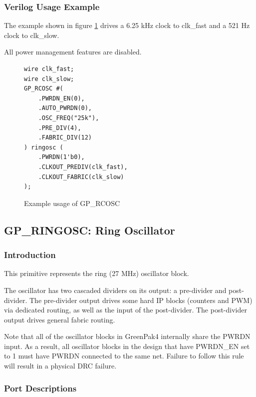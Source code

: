 \documentclass{article}
\begin{document}
\pagebreak
\subsubsection{Verilog Usage Example}

The example shown in figure \ref{gp-rcosc-example} drives a 6.25 kHz clock to clk\_fast and a 521 Hz clock to
clk\_slow.

All power management features are disabled.

\begin{figure}[h]
\begin{lstlisting}
wire clk_fast;
wire clk_slow;
GP_RCOSC #(
	.PWRDN_EN(0),
	.AUTO_PWRDN(0),
	.OSC_FREQ("25k"),
	.PRE_DIV(4),
	.FABRIC_DIV(12)
) ringosc (
	.PWRDN(1'b0),
	.CLKOUT_PREDIV(clk_fast),
	.CLKOUT_FABRIC(clk_slow)
);
\end{lstlisting}
\caption{Example usage of GP\_RCOSC}
\label{gp-rcosc-example}
\end{figure}


\pagebreak
\subsection{GP\_RINGOSC: Ring Oscillator}

\subsubsection{Introduction}
This primitive represents the ring (27 MHz) oscillator block.

The oscillator has two cascaded dividers on its output: a pre-divider and post-divider. The pre-divider output drives 
some hard IP blocks (counters and PWM) via dedicated routing, as well as the input of the post-divider. The 
post-divider output drives general fabric routing.

Note that all of the oscillator blocks in GreenPak4 internally share the PWRDN input. As a result, all oscillator 
blocks in the design that have PWRDN\_EN set to 1 must have PWRDN connected to the same net. Failure to follow this 
rule will result in a physical DRC failure.

\subsubsection{Port Descriptions}
\end{document}

